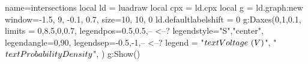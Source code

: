 \documentclass{standalone}
\begin{document}
    \begin{luadraw}{name=intersections}
    local ld = luadraw
    local cpx = ld.cpx
    local g = ld.graph:new{ window={-1.5, 9, -0.1, 0.7}, size={10, 10, 0}}
    ld.defaultlabelshift = 0
    g:Daxes({0,1,0.1}, {
        limits = {{0,8.5},{0,0.7}},
        legendpos={0.5,0.5},-- <--?
        legendstyle={"S","center"},
        legendangle={0,90},
        legendsep={-0.5,-1},-- <--?
        legend = {"$\\text{Voltage}~(V)$", "$\\text{Probability Density}$"},
    })
    g:Show()
\end{luadraw}
\end{document}
